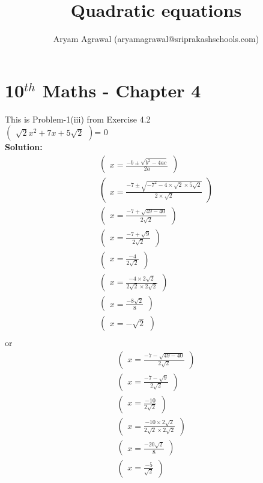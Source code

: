 \documentclass[12pt]{article}
\title{Quadratic equations}
\author{Aryam Agrawal (aryamagrawal@sriprakashschools.com)}
\newcommand{\myvec}[1]{\ensuremath{\begin{pmatrix}#1\end{pmatrix}}}
\newcommand{\solution}{\noindent \textbf{Solution: }}
\begin{document}
\section*{10$^{th}$ Maths - Chapter 4}
This is Problem-1(iii) from Exercise 4.2\\
\myvec{{\sqrt{2}}x^2+{7} x +{5\sqrt{2}} }= 0\\

\solution\\
\begin{align}
\myvec{x=\frac{-b\pm\sqrt{b^2-4ac}}{2a}}\\
\myvec{x=\frac{-7\pm\sqrt{-7^2-4 \times \sqrt{2}\times5\sqrt{2}}}{2 \times \sqrt{2}}}\\
\myvec{x=\frac{-7+\sqrt{49-40}}{2\sqrt{2}}}\\
\myvec{x=\frac{-7+\sqrt{9}}{2\sqrt{2}}}\\
\myvec{x=\frac{-4}{2\sqrt{2}}}\\
\myvec{x=\frac{-4\times 2\sqrt{2}}{2\sqrt{2}\times2\sqrt{2}}}\\
\myvec{x=\frac{-8\sqrt{2}}{8}}\\
\myvec{x=-\sqrt{2}}\\
\end{align}
or\\
\begin{align}
\myvec{x=\frac{-7-\sqrt{49-40}}{2\sqrt{2}}}\\
\myvec{x=\frac{-7-\sqrt{9}}{2\sqrt{2}}}\\
\myvec{x=\frac{-10}{2\sqrt{2}}}\\
\myvec{x=\frac{-10\times 2\sqrt{2}}{2\sqrt{2}\times2\sqrt{2}}}\\
\myvec{x=\frac{-20\sqrt{2}}{8}}\\
\myvec{x=\frac{-5}{\sqrt{2}}}
\end{align}
\end{document}
